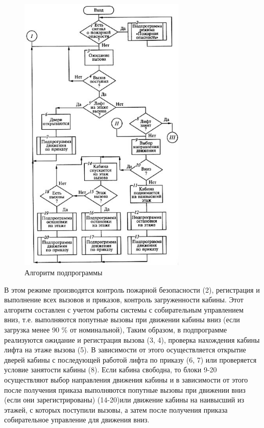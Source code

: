     \begin{figure}[h]
				\centering
				\includegraphics[width=80mm]{src/pictures/algoritm_raboti_podprogrammi.jpg}
				\caption{Алгоритм подпрограммы}\label{dk4}
        \end{figure}
        
    В этом режиме производятся контроль пожарной безопасности (2), регистрация и выполнение всех вызовов и приказов, контроль              загруженности кабины. Этот алгоритм составлен с учетом работы системы с собирательным управлением вниз, т.е. выполняются          попутные вызовы при движении кабины вниз (если загрузка менее 90 \% от номинальной), Таким образом, в подпрограмме                реализуются ожидание и регистрация вызова (3, 4), проверка нахождения кабины лифта на этаже вызова (5). В зависимости от          этого осуществляется открытие дверей кабины с последующей работой лифта по приказу (6, 7) или проверяется условие занятости      кабины (8). Если кабина свободна, то блоки 9-20 осуществляют выбор направления движения кабины и в зависимости от этого          после получения приказа выполняются попутные вызовы при движении вниз (если они зарегистрированы) (14-20)или движение          кабины на наивысший из этажей, с которых поступили вызовы, а затем после получения приказа собирательное управление для          движения вниз.

